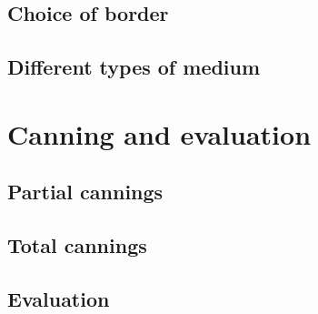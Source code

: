 \documentclass{article}
\begin{document}
\subsection{Choice of border}

\subsection{Different types of medium}

\section{Canning and evaluation}

\subsection{Partial cannings}

\subsection{Total cannings}

\subsection{Evaluation}

\printbibliography[heading=bibintoc]
\end{document}
